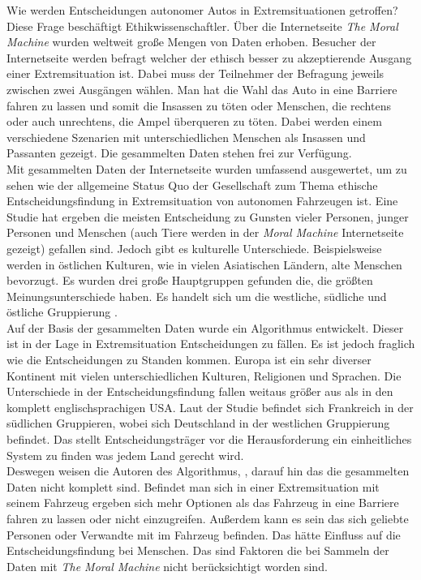 Wie werden Entscheidungen autonomer Autos in Extremsituationen getroffen? Diese Frage beschäftigt Ethikwissenschaftler. Über die Internetseite \textit{The Moral Machine} wurden weltweit große Mengen von Daten erhoben. Besucher der Internetseite werden befragt welcher der ethisch besser zu akzeptierende Ausgang einer Extremsituation ist. Dabei muss der Teilnehmer der Befragung jeweils zwischen zwei Ausgängen wählen. Man hat die Wahl das Auto in eine Barriere fahren zu lassen und somit die Insassen zu töten oder Menschen, die rechtens oder auch unrechtens, die Ampel überqueren zu töten. Dabei werden einem verschiedene Szenarien mit unterschiedlichen Menschen als Insassen und Passanten gezeigt. Die gesammelten Daten stehen frei zur Verfügung.\\

Mit gesammelten Daten der Internetseite wurden umfassend ausgewertet, um zu sehen wie der allgemeine Status Quo der Gesellschaft zum Thema ethische Entscheidungsfindung in Extremsituation von autonomen Fahrzeugen ist. Eine Studie hat ergeben die meisten Entscheidung zu Gunsten vieler Personen, junger Personen und Menschen (auch Tiere werden in der \textit{Moral Machine} Internetseite gezeigt) gefallen sind. Jedoch gibt es kulturelle Unterschiede. Beispielsweise werden in östlichen Kulturen, wie in vielen Asiatischen Ländern, alte Menschen bevorzugt. Es wurden drei große Hauptgruppen gefunden die, die größten Meinungsunterschiede haben. Es handelt sich um die westliche, südliche und östliche Gruppierung \cite{moralMachine}.\\

Auf der Basis der gesammelten Daten wurde ein Algorithmus \cite{votingBasedSystem} entwickelt. Dieser ist in der Lage in Extremsituation Entscheidungen zu fällen. Es ist jedoch fraglich wie die Entscheidungen zu Standen kommen. Europa ist ein sehr diverser Kontinent mit vielen unterschiedlichen Kulturen, Religionen und Sprachen. Die Unterschiede in der Entscheidungsfindung fallen weitaus größer aus als in den komplett englischsprachigen USA. Laut der Studie befindet sich Frankreich in der südlichen Gruppieren, wobei sich Deutschland in der westlichen Gruppierung befindet. Das stellt Entscheidungsträger vor die Herausforderung ein einheitliches System zu finden was jedem Land gerecht wird.\\

Deswegen weisen die Autoren des Algorithmus, \citeauthor{votingBasedSystem}, darauf hin das die gesammelten Daten nicht komplett sind. Befindet man sich in einer Extremsituation mit seinem Fahrzeug ergeben sich mehr Optionen als das Fahrzeug in eine Barriere fahren zu lassen oder nicht einzugreifen. Außerdem kann es sein das sich geliebte Personen oder Verwandte mit im Fahrzeug befinden. Das hätte Einfluss auf die Entscheidungsfindung bei Menschen. Das sind Faktoren die bei Sammeln der Daten mit \textit{The Moral Machine} nicht berücksichtigt worden sind.\\

